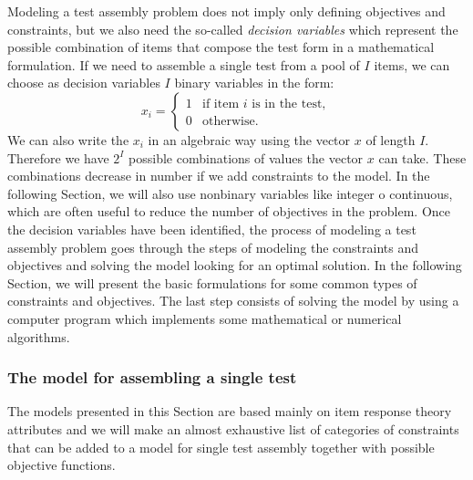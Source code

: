 Modeling a test assembly problem does not imply only defining objectives and constraints, but we also need the so-called \emph{decision variables} which represent the possible combination of items that compose the test form in a mathematical formulation. If we need to assemble a single test from a pool of $I$ items, we can choose as decision variables $I$ binary variables in the form:
\begin{equation*}\label{eq:optvar}
x_{i}=
\begin{cases}
1 & \mbox{if item }i \mbox{ is in the test},\\
0 & \mbox{otherwise}.
\end{cases}
\end{equation*}
We can also write the $x_i$ in an algebraic way using the vector $x$ of length $I$. Therefore we have $2^I$ possible combinations of values the vector $x$ can take. These combinations decrease in number if we add constraints to the model. In the following Section, we will also use nonbinary variables like integer o continuous, which are often useful to reduce the number of objectives in the problem. Once the decision variables have been identified, the process of modeling a test assembly problem goes through the steps of modeling the constraints and objectives and solving the model looking for an optimal solution.
In the following Section, we will present the basic formulations for some common types of constraints and objectives. The last step consists of solving the model by using a computer program which implements some mathematical or numerical algorithms.

\subsubsection{The model for assembling a single test}
The models presented in this Section are based mainly on item response theory attributes and we will make an almost exhaustive list of categories of constraints that can be added to a model for single test assembly together with possible objective functions.

